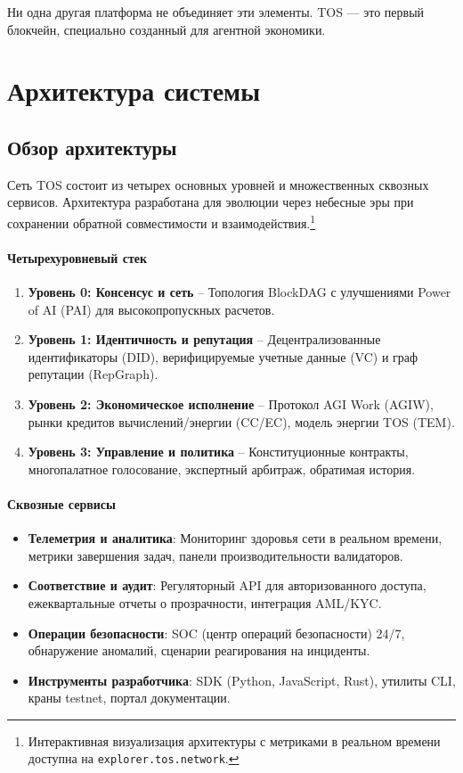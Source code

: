 \documentclass[11pt]{article}
\begin{document}
Ни одна другая платформа не объединяет эти элементы. TOS — это первый блокчейн, специально созданный для агентной экономики.

\section{Архитектура системы}
\subsection{Обзор архитектуры}
Сеть TOS состоит из четырех основных уровней и множественных сквозных сервисов. Архитектура разработана для эволюции через небесные эры при сохранении обратной совместимости и взаимодействия.\footnote{Интерактивная визуализация архитектуры с метриками в реальном времени доступна на \texttt{explorer.tos.network}.}

\paragraph{Четырехуровневый стек}
\begin{enumerate}[noitemsep]
  \item \textbf{Уровень 0: Консенсус и сеть} -- Топология BlockDAG с улучшениями Power of AI (PAI) для высокопропускных расчетов.
  \item \textbf{Уровень 1: Идентичность и репутация} -- Децентрализованные идентификаторы (DID), верифицируемые учетные данные (VC) и граф репутации (RepGraph).
  \item \textbf{Уровень 2: Экономическое исполнение} -- Протокол AGI Work (AGIW), рынки кредитов вычислений/энергии (CC/EC), модель энергии TOS (TEM).
  \item \textbf{Уровень 3: Управление и политика} -- Конституционные контракты, многопалатное голосование, экспертный арбитраж, обратимая история.
\end{enumerate}

\paragraph{Сквозные сервисы}
\begin{itemize}[noitemsep]
  \item \textbf{Телеметрия и аналитика}: Мониторинг здоровья сети в реальном времени, метрики завершения задач, панели производительности валидаторов.
  \item \textbf{Соответствие и аудит}: Регуляторный API для авторизованного доступа, ежеквартальные отчеты о прозрачности, интеграция AML/KYC.
  \item \textbf{Операции безопасности}: SOC (центр операций безопасности) 24/7, обнаружение аномалий, сценарии реагирования на инциденты.
  \item \textbf{Инструменты разработчика}: SDK (Python, JavaScript, Rust), утилиты CLI, краны testnet, портал документации.
\end{itemize}
\end{document}
